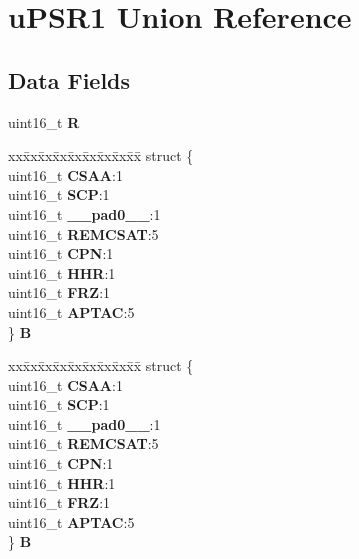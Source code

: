 \hypertarget{unionuPSR1}{}\section{u\+P\+S\+R1 Union Reference}
\label{unionuPSR1}
\subsection*{Data Fields}
\begin{DoxyCompactItemize}
\item 
\mbox{\label{unionuPSR1_a72c8dcc9ff464f01241256315ab79888}} 
uint16\+\_\+t {\bfseries R}
\item 
\mbox{\label{unionuPSR1_a002057d4560dcee00b3075f61eb86b78}} 
\begin{tabbing}
xx\=xx\=xx\=xx\=xx\=xx\=xx\=xx\=xx\=\kill
struct \{\\
\>uint16\_t {\bfseries CSAA}:1\\
\>uint16\_t {\bfseries SCP}:1\\
\>uint16\_t {\bfseries \_\_pad0\_\_}:1\\
\>uint16\_t {\bfseries REMCSAT}:5\\
\>uint16\_t {\bfseries CPN}:1\\
\>uint16\_t {\bfseries HHR}:1\\
\>uint16\_t {\bfseries FRZ}:1\\
\>uint16\_t {\bfseries APTAC}:5\\
\} {\bfseries B}\\

\end{tabbing}\item 
\mbox{\label{unionuPSR1_abaaaea06c9089a777d7993a0e9693598}} 
\begin{tabbing}
xx\=xx\=xx\=xx\=xx\=xx\=xx\=xx\=xx\=\kill
struct \{\\
\>uint16\_t {\bfseries CSAA}:1\\
\>uint16\_t {\bfseries SCP}:1\\
\>uint16\_t {\bfseries \_\_pad0\_\_}:1\\
\>uint16\_t {\bfseries REMCSAT}:5\\
\>uint16\_t {\bfseries CPN}:1\\
\>uint16\_t {\bfseries HHR}:1\\
\>uint16\_t {\bfseries FRZ}:1\\
\>uint16\_t {\bfseries APTAC}:5\\
\} {\bfseries B}\\


\end{tabbing}
\end{DoxyCompactItemize}
